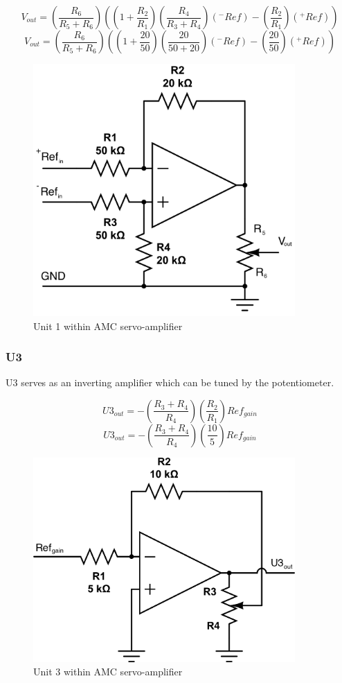 \documentclass{article}
\theoremstyle{plain}
\theoremstyle{definition}
\theoremstyle{remark}
\begin{document}
$$ V_{out} = \left( \frac{R_6}{R_5+R_6} \right) \left( \left(1 + \frac{R_2}{R_1} \right) \left( \frac{R_4}{R_3+R_4} \right) (^-Ref) - \left( \frac{R_2}{R_1} \right) (^+Ref) \right) $$
$$ V_{out} = \left( \frac{R_6}{R_5+R_6} \right) \left( \left(1+ \frac{20}{50} \right) \left( \frac{20}{50+20} \right)(^-Ref) - \left( \frac{20}{50} \right) (^+Ref) \right) $$

\begin{figure}[htb]
\begin{center}
\includegraphics[width = 10cm]{q1a_u1.png}
\caption{Unit 1 within AMC servo-amplifier}
\label{q1_au1}
\end{center}
\end{figure}

\subsubsection*{U3}

U3 serves as an inverting amplifier which can be tuned by the potentiometer.

$$U3_{out} = - \left( \frac{R_3 + R_4}{R_4} \right) \left( \frac{R_2}{R_1} \right) Ref_{gain} $$
$$U3_{out} = - \left( \frac{R_3 + R_4}{R_4} \right) \left( \frac{10}{5} \right) Ref_{gain} $$

\begin{figure}[htb]
\begin{center}
\includegraphics[width = 10cm]{q1a_u3.png}
\caption{Unit 3 within AMC servo-amplifier}
\label{q1_au3}
\end{center}
\end{figure}
\end{document}
